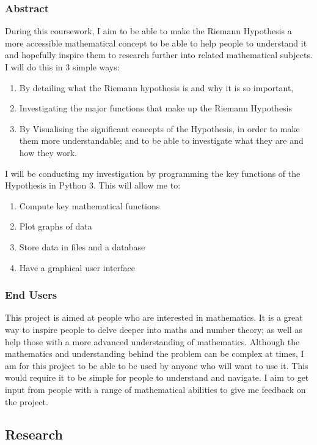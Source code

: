 \documentclass[12pt]{article}
\begin{document}
\subsubsection{Abstract}

During this coursework, I aim to be able to make the Riemann Hypothesis a more accessible mathematical concept to be able to help people to understand it and hopefully inspire them to research further into related mathematical subjects. I will do this in 3 simple ways:
\begin{enumerate}
\item By detailing what the Riemann hypothesis is and why it is so important,
\item Investigating the major functions that make up the Riemann Hypothesis
\item By Visualising the significant concepts of the Hypothesis, in order to make them more understandable; and to be able to investigate what they are and how they work.
\end{enumerate}

I will be conducting my investigation by programming the key functions of the Hypothesis in Python 3. This will allow me to:
\begin{enumerate}
    \item Compute key mathematical functions
    \item Plot graphs of data
    \item Store data in files and a database
    \item Have a graphical user interface
\end{enumerate}

\subsubsection{End Users}

This project is aimed at people who are interested in mathematics. It is a great way to inspire people to delve deeper into maths and number theory; as well as help those with a more advanced understanding of mathematics. Although the mathematics and understanding behind the problem can be complex at times, I am for this project to be able to be used by anyone who will want to use it. This would require it to be simple for people to understand and navigate. I aim to get input from people with a range of mathematical abilities to give me feedback on the project.


\subsection{Research}
\end{document}
